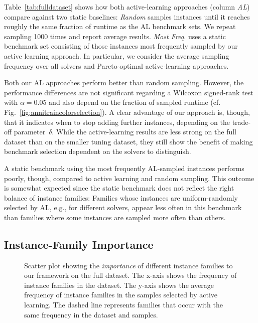 \documentclass[runningheads]{llncs}
\begin{document}
Table~\ref{tab:fulldataset} shows how both active-learning approaches (column \emph{AL}) compare against two static baselines:
\emph{Random} samples instances until it reaches roughly the same fraction of runtime as the AL benchmark sets.
We repeat sampling 1000 times and report average results.
\emph{Most Freq.} uses a static benchmark set consisting of those instances most frequently sampled by our active learning approach.
In particular, we consider the average sampling frequency over all solvers and Pareto-optimal active-learning approaches.

Both our AL approaches perform better than random sampling.
However, the performance differences are not significant regarding a Wilcoxon signed-rank test with $\alpha = 0.05$ and also depend on the fraction of sampled runtime (cf. Fig.~\ref{fig:annitraincolorselection}).
A clear advantage of our approach is, though, that it indicates when to stop adding further instances, depending on the trade-off parameter~$\delta$.
While the active-learning results are less strong on the full dataset than on the smaller tuning dataset, they still show the benefit of making benchmark selection dependent on the solvers to distinguish.

A static benchmark using the most frequently AL-sampled instances performs poorly, though, compared to active learning and random sampling.
This outcome is somewhat expected since the static benchmark does not reflect the right balance of instance families:
Families whose instances are uniform-randomly selected by AL, e.g., for different solvers, appear less often in this benchmark than families where some instances are sampled more often than others.

\subsection{Instance-Family Importance}

\begin{figure}[tb]
  \centering
  \caption{
    Scatter plot showing the \emph{importance} of different instance families to our framework on the full dataset.
    The x-axis shows the frequency of instance families in the dataset.
    The y-axis shows the average frequency of instance families in the samples selected by active learning.
    The dashed line represents families that occur with the same frequency in the dataset and samples.
  }
  \label{fig:annifinalfamilies}
\end{figure}
\end{document}
